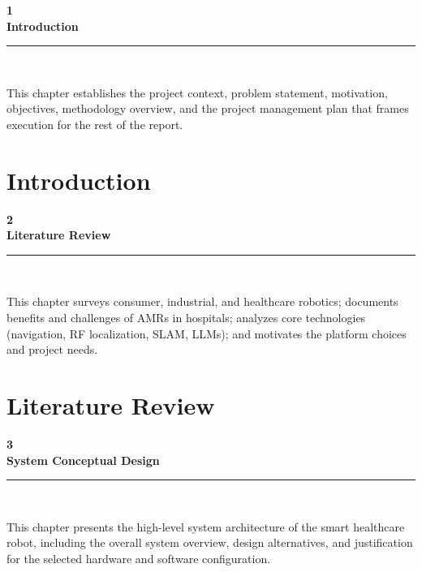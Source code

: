 \documentclass[11pt,a4paper]{article}
\begin{document}

\tableofcontents
\thispagestyle{empty}
\newpage
\setcounter{page}{1}

\newcommand{\chapterintro}[3]{%
\clearpage
\thispagestyle{empty}%
\vspace*{2cm}%
\begin{center}
    {\fontsize{72}{72}\selectfont \textbf{#1}}\\[0.6cm]
    {\LARGE\bfseries #2}\\[0.6cm]
    \rule{0.75\textwidth}{0.6pt}\\[0.6cm]
    \parbox{0.75\textwidth}{\large #3}
\end{center}
\vfill
\clearpage
}
\chapterintro{1}{Introduction}{This chapter establishes the project context, problem statement, motivation, objectives, methodology overview, and the project management plan that frames execution for the rest of the report.}
\section{Introduction}












%

\chapterintro{2}{Literature Review}{This chapter surveys consumer, industrial, and healthcare robotics; documents benefits and challenges of AMRs in hospitals; analyzes core technologies (navigation, RF localization, SLAM, LLMs); and motivates the platform choices and project needs.}
\section{Literature Review}


\chapterintro{3}{System Conceptual Design}{This chapter presents the high-level system architecture of the smart healthcare robot, including the overall system overview, design alternatives, and justification for the selected hardware and software configuration.}
\end{document}
